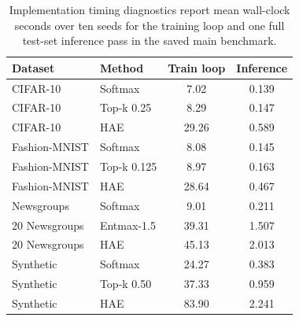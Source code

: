 \begin{table}[!htbp]
\centering
\small
\caption{Implementation timing diagnostics report mean wall-clock seconds over ten seeds for the training loop and one full test-set inference pass in the saved main benchmark.}
\label{tab:runtime-summary}
\begin{tabular}{@{}llcc@{}}
\toprule
Dataset & Method & Train loop & Inference \\
\midrule
CIFAR-10 & Softmax & 7.02 & 0.139 \\
CIFAR-10 & Top-k 0.25 & 8.29 & 0.147 \\
CIFAR-10 & HAE & 29.26 & 0.589 \\
\addlinespace
Fashion-MNIST & Softmax & 8.08 & 0.145 \\
Fashion-MNIST & Top-k 0.125 & 8.97 & 0.163 \\
Fashion-MNIST & HAE & 28.64 & 0.467 \\
\addlinespace
20 Newsgroups & Softmax & 9.01 & 0.211 \\
20 Newsgroups & Entmax-1.5 & 39.31 & 1.507 \\
20 Newsgroups & HAE & 45.13 & 2.013 \\
\addlinespace
Synthetic & Softmax & 24.27 & 0.383 \\
Synthetic & Top-k 0.50 & 37.33 & 0.959 \\
Synthetic & HAE & 83.90 & 2.241 \\
\bottomrule
\end{tabular}
\end{table}
